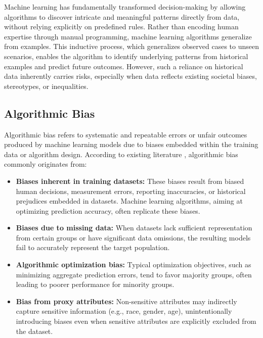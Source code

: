 Machine learning has fundamentally transformed decision-making by
allowing algorithms to discover intricate and
meaningful patterns directly from data, without relying explicitly on
predefined rules. Rather than encoding
human expertise through manual programming, machine learning
algorithms generalize from examples. This inductive
process, which generalizes observed cases to unseen scenarios,
enables the algorithm to identify underlying patterns
from historical examples and predict future outcomes. However, such a
reliance on historical data inherently carries
risks, especially when data reflects existing societal biases,
stereotypes, or inequalities.

\subsection{Algorithmic Bias}\label{subsec:algorithmic_bias}

Algorithmic bias refers to systematic and repeatable errors or unfair
outcomes produced by machine learning models
due to biases embedded within the training data or algorithm design.
According to existing literature
\cite{barocas2016big,pessach2020algorithmic}, algorithmic bias
commonly originates from:

\begin{itemize}
  \item \textbf{Biases inherent in training datasets:} These biases
    result from biased human decisions, measurement errors,
    reporting inaccuracies, or historical prejudices embedded in
    datasets. Machine learning algorithms, aiming at optimizing
    prediction accuracy, often replicate these biases.
  \item \textbf{Biases due to missing data:} When datasets lack
    sufficient representation from certain groups or have
    significant data omissions, the resulting models fail to
    accurately represent the target population.
  \item \textbf{Algorithmic optimization bias:} Typical optimization
    objectives, such as minimizing aggregate prediction
    errors, tend to favor majority groups, often leading to poorer
    performance for minority groups.
  \item \textbf{Bias from proxy attributes:} Non-sensitive attributes
    may indirectly capture sensitive information
    (e.g., race, gender, age), unintentionally introducing biases
    even when sensitive attributes are explicitly excluded
    from the dataset.
\end{itemize}

